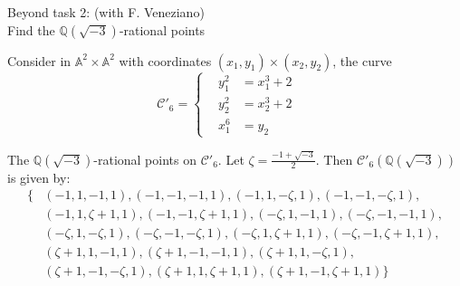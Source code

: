 \documentclass[handout]{beamer}
\newcommand{\qe}{\mathbb{Q}}
\newcommand{\Ci}{\mathcal{C}}
\begin{document}
 \begin{frame}{Beyond task 2: (with F. Veneziano)\\
 Find the  $\qe(\sqrt{-3})$-rational points}
\begin{example}
Consider in $\mathbb{A}^2\times\mathbb{A}^2$ with coordinates  $(x_1,y_1)\times (x_2,y_2)$, the curve
\begin{equation*}
\mathcal{C}'_6=\begin{cases}
\,\,\,\,\,y_1^2&=x_1^3+2\,\,\,\,\,\,\,\,\\
\,\,\,\,\,y_2^2&=x_2^3+2\,\,\,\,\,\,\,\,\\
\,\,\,\,\,x_1^6&=y_2
\end{cases}
\end{equation*}
\pause

 \begin{alertblock}{The $\mathbb{Q}(\sqrt{-3})$-rational points on $\mathcal{C}'_6$.}
 Let $\zeta=\frac{-1+\sqrt{-3}}{2}$. Then $\Ci'_6(\qe(\sqrt{-3}))$ is given by:
 \vspace{-0.2cm}
  \[ \begin{aligned} \{&(-1,1,-1,1), (-1,-1,-1,1), 
  (-1,1,-\zeta,1), (-1,-1,-\zeta,1),\\
  &(-1,1,\zeta+1,1), (-1,-1,\zeta+1,1),
  (-\zeta,1,-1,1), (-\zeta,-1,-1,1), \\
  &(-\zeta,1,-\zeta,1), (-\zeta,-1,-\zeta,1),
  (-\zeta,1,\zeta+1,1), (-\zeta,-1,\zeta+1,1),\\
  &(\zeta+1,1,-1,1), (\zeta+1,-1,-1,1), 
  (\zeta+1,1,-\zeta,1),\\ &(\zeta+1,-1,-\zeta,1),
  (\zeta+1,1,\zeta+1,1), (\zeta+1,-1,\zeta+1,1)
  \}	
  \end{aligned} 
  \]
  
 
 \end{alertblock}
 \end{example}
 \end{frame}
\end{document}
